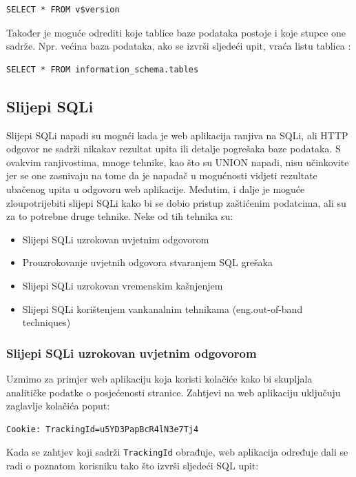 \documentclass[12pt, oneside, onecolumn]{book}
\begin{document}
{\begin{verbatim}
SELECT * FROM v$version
\end{verbatim}

Također je moguće odrediti koje tablice baze podataka postoje i koje stupce one sadrže. Npr. većina baza podataka, ako se izvrši sljedeći upit, vraća listu tablica \cite{sitesqli}:

\begin{verbatim}
SELECT * FROM information_schema.tables
\end{verbatim}

\subsection{Slijepi SQLi}
Slijepi SQLi napadi su mogući kada je web aplikacija ranjiva na SQLi, ali HTTP odgovor ne sadrži nikakav rezultat upita ili detalje pogrešaka baze podataka. S ovakvim ranjivostima, mnoge tehnike, kao što su UNION napadi, nisu učinkovite jer se one zasnivaju na tome da je napadač u mogućnosti vidjeti rezultate ubačenog upita u odgovoru web aplikacije. Međutim, i dalje je moguće zloupotrijebiti slijepi SQLi kako bi se dobio pristup zaštićenim podatcima, ali su za to potrebne druge tehnike. Neke od tih tehnika su:

\begin{itemize}
\item Slijepi SQLi uzrokovan uvjetnim odgovorom
\item Prouzrokovanje uvjetnih odgovora stvaranjem SQL grešaka
\item Slijepi SQLi uzrokovan vremenskim kašnjenjem
\item Slijepi SQLi korištenjem vankanalnim tehnikama (eng.out-of-band techniques) 
\end{itemize}

\subsubsection{Slijepi SQLi uzrokovan uvjetnim odgovorom}
Uzmimo za primjer web aplikaciju koja koristi kolačiće kako bi skupljala analitičke podatke o posjećenosti stranice. Zahtjevi na web aplikaciju uključuju zaglavlje kolačića poput:

\begin{verbatim}
Cookie: TrackingId=u5YD3PapBcR4lN3e7Tj4
\end{verbatim}

Kada se zahtjev koji sadrži \texttt{TrackingId} obrađuje, web aplikacija određuje dali se radi o poznatom korisniku tako što izvrši sljedeći SQL upit:

}
\end{document}
